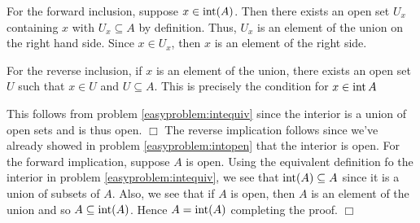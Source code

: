 \documentclass{article}
\begin{document}
 {
    For the forward inclusion, suppose $x\in \operatorname{int} (A)$. Then there exists an open set $U_{x}$ containing $x$ with $U_{x}\subseteq A$ by definition. Thus, $U_{x}$ is an element of the union on the right hand side. Since $x\in U_{x}$, then $x$ is an element of the right side.

    For the reverse inclusion, if $x$ is an element of the union, there exists an open set $U$ such that $x\in U$ and $U\subseteq A$. This is precisely the condition for $x\in \operatorname{int} A$
}

 {
    This follows from problem \ref{easyproblem:intequiv} since the interior is a union of open sets and is thus open. $\Box$
}
 {
    The reverse implication follows since we've already showed in problem \ref{easyproblem:intopen} that the interior is open. For the forward implication, suppose $A$ is open. Using the equivalent definition fo the interior in problem \ref{easyproblem:intequiv}, we see that $\operatorname{int}(A)\subseteq A$ since it is a union of subsets of $A$. Also, we see that if $A$ is open, then $A$ is an element of the union and so $A\subseteq \operatorname{int} (A)$. Hence $A = \operatorname{int}(A)$ completing the proof. $\Box$
}
\end{document}

